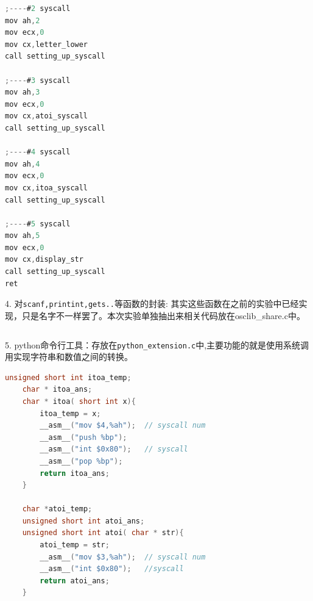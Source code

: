 \documentclass[a4paper]{article}
\begin{document}
{{{{\begin{lstlisting}[language={C}]
;----#2 syscall
mov ah,2
mov ecx,0
mov cx,letter_lower
call setting_up_syscall

;----#3 syscall
mov ah,3
mov ecx,0
mov cx,atoi_syscall
call setting_up_syscall

;----#4 syscall
mov ah,4
mov ecx,0
mov cx,itoa_syscall
call setting_up_syscall

;----#5 syscall
mov ah,5
mov ecx,0
mov cx,display_str
call setting_up_syscall
ret
	\end{lstlisting}}
	4. 对\verb|scanf,printint,gets..|等函数的封装:
	其实这些函数在之前的实验中已经实现，只是名字不一样罢了。本次实验单独抽出来相关代码放在osclib\_share.c中。
	{\scriptsize
	\begin{lstlisting}[language={C}]
	\end{lstlisting}}
	5. python命令行工具：存放在\verb|python_extension.c|中,主要功能的就是使用系统调用实现字符串和数值之间的转换。
	\begin{lstlisting}[language={C}]
	unsigned short int itoa_temp;
	char * itoa_ans;
	char * itoa( short int x){
		itoa_temp = x;
		__asm__("mov $4,%ah");  // syscall num
		__asm__("push %bp");
		__asm__("int $0x80");	// syscall
		__asm__("pop %bp");
		return itoa_ans;
	}

	char *atoi_temp;
	unsigned short int atoi_ans;
	unsigned short int atoi( char * str){
		atoi_temp = str;
		__asm__("mov $3,%ah");  // syscall num
		__asm__("int $0x80");	//syscall
		return atoi_ans;
	}
	\end{lstlisting}
}

}}
\end{document}
